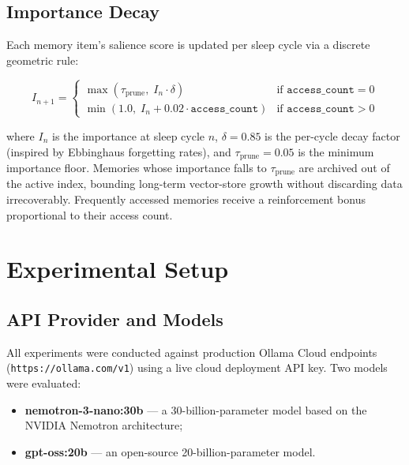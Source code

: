 \documentclass[conference]{IEEEtran}
\begin{document}
\subsection{Importance Decay}
Each memory item's salience score is updated per sleep cycle via a discrete geometric rule:

\begin{equation}
I_{n+1} =
\begin{cases}
\max(\tau_{\text{prune}},\; I_n \cdot \delta) & \text{if } \texttt{access\_count} = 0 \\
\min(1.0,\; I_n + 0.02 \cdot \texttt{access\_count}) & \text{if } \texttt{access\_count} > 0
\end{cases}
\label{eq:decay}
\end{equation}

where $I_n$ is the importance at sleep cycle $n$, $\delta = 0.85$ is the per-cycle decay factor (inspired by Ebbinghaus forgetting rates), and $\tau_{\text{prune}} = 0.05$ is the minimum importance floor. Memories whose importance falls to $\tau_{\text{prune}}$ are archived out of the active index, bounding long-term vector-store growth without discarding data irrecoverably. Frequently accessed memories receive a reinforcement bonus proportional to their access count.

\section{Experimental Setup}

\subsection{API Provider and Models}
All experiments were conducted against production Ollama Cloud endpoints (\texttt{https://ollama.com/v1}) using a live cloud deployment API key. Two models were evaluated:
\begin{itemize}
    \item \textbf{nemotron-3-nano:30b} --- a 30-billion-parameter model based on the NVIDIA Nemotron architecture;
    \item \textbf{gpt-oss:20b} --- an open-source 20-billion-parameter model.
\end{itemize}
\end{document}
